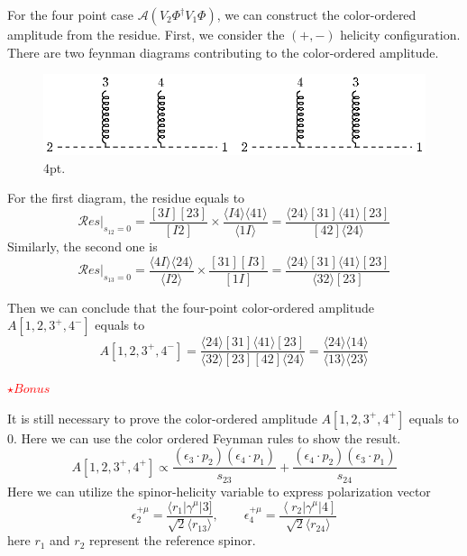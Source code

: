 \documentclass[12pt]{article}
\newcommand{\avg}[1]{\langle #1 \rangle}
\begin{document}
For the four point case $\mathcal{A}(V_2\Phi^\dagger V_1 \Phi )$, we can construct the color-ordered amplitude from the residue. First, we consider the $(+,-)$ helicity
configuration. There are two feynman diagrams contributing to the color-ordered amplitude.\\
\begin{figure}[htbp]
    \centering
    \includegraphics{4pt.eps}
    \caption{4pt.}
    \label{1}
\end{figure}

For the first diagram, the residue equals to
\begin{equation*}
    \mathcal{R}es|_{s_{12}=0}=\frac{[3 I ] [23]}{[I2]}\times \frac{\avg{I4}\avg{41}}{\avg{1I}}=\frac{\avg{24}[31]\avg{41}[23]}{[42]\avg{24}}
\end{equation*}
Similarly, the second one is
\begin{equation*}
    \mathcal{R}es|_{s_{13}=0}=\frac{\avg{4I}\avg{24}}{\avg{I2}}\times \frac{[31] [I3]}{[1I]}=\frac{\avg{24}[31]\avg{41}[23]}{\avg{32}[23]}
\end{equation*}

Then we can conclude that the four-point color-ordered amplitude $A[1,2,3^+,4^-]$ equals to
\begin{equation*}
    A[1,2,3^+,4^-]=\frac{\avg{24}[31]\avg{41}[23]}{\avg{32}[23][42]\avg{24}}=\frac{\avg{24}\avg{14}}{\avg{13}\avg{23}}
\end{equation*}

\textcolor{red}{$\star Bonus$}

It is still necessary to prove the color-ordered amplitude $A[1,2,3^+,4^+]$ equals to 0. Here we can use the color ordered Feynman rules to show the result.
\begin{equation*}
    A[1,2,3^+,4^+]\propto \frac{\left(\epsilon_3\cdot p_2\right)\left(\epsilon_4\cdot p_1\right)}{s_{23}}+\frac{\left(\epsilon_4\cdot p_2\right)\left(\epsilon_3\cdot p_1\right)}{s_{24}} 
\end{equation*}
Here we can utilize the spinor-helicity variable to express polarization vector
\begin{equation*}
    \epsilon_2^{+\mu}=\frac{\langle r_1 | \gamma^\mu | 3 ]}{\sqrt{2}\avg{r_13}},\qquad \epsilon_4^{+\mu}=\frac{\left <r_2|\gamma^\mu|4\right ]}{\sqrt{2}\avg{r_24}}
\end{equation*}
here $r_1$ and $r_2$ represent the reference spinor.
\end{document}
